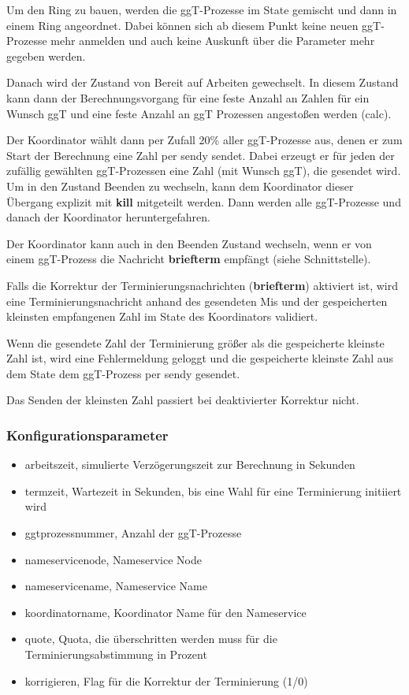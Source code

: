 \documentclass{article}
\begin{document}
Um den Ring zu bauen, werden die ggT-Prozesse im State gemischt und dann in einem Ring angeordnet. Dabei können sich
ab diesem Punkt keine neuen ggT-Prozesse mehr anmelden und auch keine Auskunft über die Parameter mehr gegeben werden.

Danach wird der Zustand von Bereit auf Arbeiten gewechselt. In diesem Zustand kann dann der Berechnungsvorgang für eine
feste Anzahl an Zahlen für ein Wunsch ggT und eine feste Anzahl an ggT Prozessen angestoßen werden (calc).

Der Koordinator wählt dann per Zufall 20\% aller ggT-Prozesse aus, denen er zum Start der Berechnung eine Zahl per sendy
sendet. Dabei erzeugt er für jeden der zufällig gewählten ggT-Prozessen eine Zahl (mit Wunsch ggT), die gesendet wird.\\

Um in den Zustand Beenden zu wechseln, kann dem Koordinator dieser Übergang explizit mit \textbf{kill} mitgeteilt werden.
Dann werden alle ggT-Prozesse und danach der Koordinator heruntergefahren.

Der Koordinator kann auch in den Beenden Zustand wechseln, wenn er von einem ggT-Prozess die Nachricht \textbf{briefterm}
empfängt (siehe Schnittstelle).

Falls die Korrektur der Terminierungsnachrichten (\textbf{briefterm}) aktiviert ist, wird eine Terminierungsnachricht
anhand des gesendeten Mis und der gespeicherten kleinsten empfangenen Zahl im State des Koordinators validiert.

Wenn die gesendete Zahl der Terminierung größer als die gespeicherte kleinste Zahl ist, wird eine Fehlermeldung geloggt
und die gespeicherte kleinste Zahl aus dem State dem ggT-Prozess per sendy gesendet.

Das Senden der kleinsten Zahl passiert bei deaktivierter Korrektur nicht.

\subsubsection{Konfigurationsparameter}
\begin{itemize}
    \item arbeitszeit, simulierte Verzögerungszeit zur Berechnung in Sekunden
    \item termzeit, Wartezeit in Sekunden, bis eine Wahl für eine Terminierung initiiert wird
    \item ggtprozessnummer, Anzahl der ggT-Prozesse
    \item nameservicenode, Nameservice Node
    \item nameservicename, Nameservice Name
    \item koordinatorname, Koordinator Name für den Nameservice
    \item quote, Quota, die überschritten werden muss für die Terminierungsabstimmung in Prozent
    \item korrigieren, Flag für die Korrektur der Terminierung (1/0)
\end{itemize}
\end{document}
